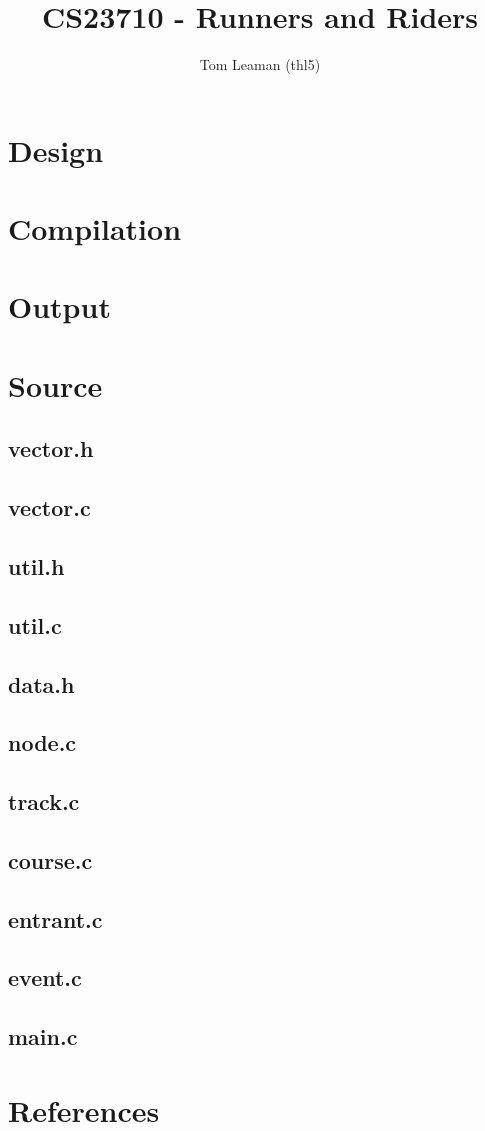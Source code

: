 \documentclass[a4paper, twoside]{article}
\title{CS23710 - Runners and Riders}
\author{Tom Leaman (thl5)}
\begin{document}
\maketitle

\section{Design}

\section{Compilation}

\section{Output}

\section{Source}
\subsection{vector.h}

\subsection{vector.c}

\subsection{util.h}

\subsection{util.c}

\subsection{data.h}

\subsection{node.c}

\subsection{track.c}

\subsection{course.c}

\subsection{entrant.c}

\subsection{event.c}

\subsection{main.c}


\section{References}
\end{document}
